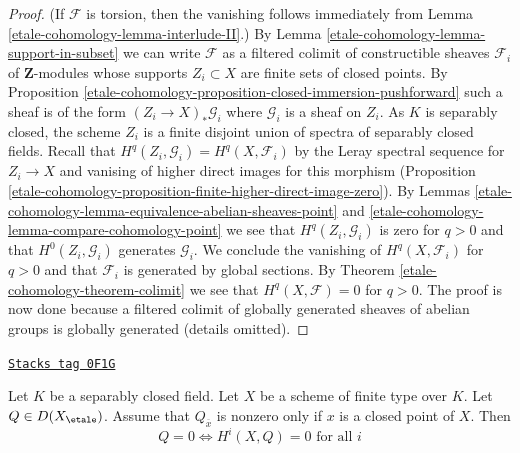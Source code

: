 \begin{proof}
(If $\mathcal{F}$ is torsion, then the vanishing follows immediately
from Lemma \ref{etale-cohomology-lemma-interlude-II}.)
By Lemma \ref{etale-cohomology-lemma-support-in-subset} we can write $\mathcal{F}$
as a filtered colimit of constructible sheaves $\mathcal{F}_i$
of $\mathbf{Z}$-modules whose supports $Z_i \subset X$ are finite
sets of closed points. By
Proposition \ref{etale-cohomology-proposition-closed-immersion-pushforward}
such a sheaf is of the form $(Z_i \to X)_*\mathcal{G}_i$
where $\mathcal{G}_i$ is a sheaf on $Z_i$. As $K$ is separably closed,
the scheme $Z_i$ is a finite disjoint union of spectra of separably closed
fields. Recall that $H^q(Z_i, \mathcal{G}_i) = H^q(X, \mathcal{F}_i)$
by the Leray spectral sequence for $Z_i \to X$ and vanising of higher
direct images for this morphism
(Proposition \ref{etale-cohomology-proposition-finite-higher-direct-image-zero}).
By Lemmas \ref{etale-cohomology-lemma-equivalence-abelian-sheaves-point} and
\ref{etale-cohomology-lemma-compare-cohomology-point}
we see that $H^q(Z_i, \mathcal{G}_i)$ is zero for $q > 0$
and that $H^0(Z_i, \mathcal{G}_i)$ generates $\mathcal{G}_i$.
We conclude the vanishing of $H^q(X, \mathcal{F}_i)$ for $q > 0$
and that $\mathcal{F}_i$ is generated by global sections.
By Theorem \ref{etale-cohomology-theorem-colimit} we see that
$H^q(X, \mathcal{F}) = 0$ for $q > 0$.
The proof is now done because a
filtered colimit of globally generated sheaves of abelian groups
is globally generated (details omitted).
\end{proof}

\begin{lemma}
\label{etale-cohomology-lemma-vanishing-closed-points}
\href{https://stacks.math.columbia.edu/tag/0F1G}{\texttt{Stacks tag 0F1G}}

Let $K$ be a separably closed field. Let $X$ be a scheme of finite
type over $K$. Let $Q \in D(X_\etale)$. Assume that $Q_{\overline{x}}$
is nonzero only if $x$ is a closed point of $X$. Then
$$
Q = 0 \Leftrightarrow H^i(X, Q) = 0 \text{ for all }i
$$
\end{lemma}


